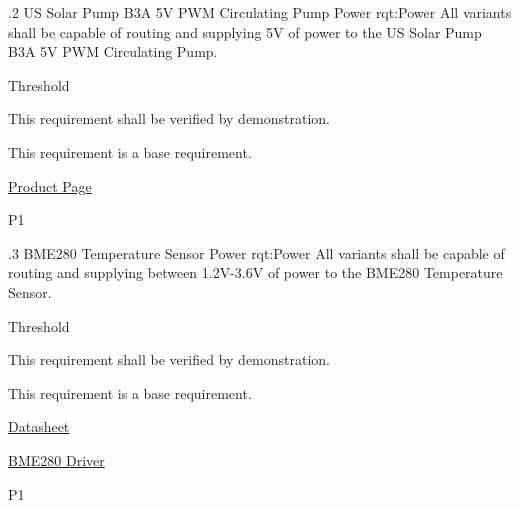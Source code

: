 \ONERQMTVKPP
{\RqtNumberBase.2}
{US Solar Pump B3A 5V PWM Circulating Pump Power}
{rqt:Power}
{All \ThisSys variants shall be capable of routing and supplying 5V of power to the US Solar Pump B3A 5V PWM Circulating Pump.}
{
	\item [All Phases] Threshold
}
{This requirement shall be verified by demonstration.}
{
	\item [N/A] This requirement is a base requirement.
}
{
	\item \href{https://www.ussolarpumps.com/catalog/5v-pwm-wired-pumps/b3a-5v-pwm-circulating-pump/}{Product Page}
}
{P1}

\ONERQMTVKPP
{\RqtNumberBase.3}
{BME280 Temperature Sensor Power}
{rqt:Power}
{All \ThisSys variants shall be capable of routing and supplying between 1.2V-3.6V of power to the BME280 Temperature Sensor.}
{
	\item [All Phases] Threshold
}
{This requirement shall be verified by demonstration.}
{
	\item [N/A] This requirement is a base requirement.
}
{
    \item \href{https://cdn-learn.adafruit.com/assets/assets/000/115/588/original/bst-bme280-ds002.pdf?1664822559}{Datasheet}
  	\item \href{https://github.com/adafruit/Adafruit_BME280_Library}{BME280 Driver}
}
{P1}

